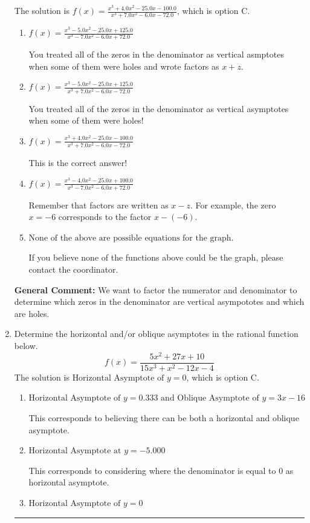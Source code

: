 \documentclass{extbook}[14pt]
\newcommand{\litem}[1]{\item #1

\rule{\textwidth}{0.4pt}}
\begin{document}
\begin{enumerate}
{The solution is \( f(x)=\frac{x^{3} +4.0 x^{2} -25.0 x -100.0}{x^{3} +7.0 x^{2} -6.0 x -72.0} \), which is option C.\begin{enumerate}[label=\Alph*.]
\item \( f(x)=\frac{x^{3} -5.0 x^{2} -25.0 x + 125.0}{x^{3} -7.0 x^{2} -6.0 x + 72.0} \)

You treated all of the zeros in the denominator as vertical asmptotes when some of them were holes and wrote factors as $x+z$.
\item \( f(x)=\frac{x^{3} -5.0 x^{2} -25.0 x + 125.0}{x^{3} +7.0 x^{2} -6.0 x -72.0} \)

You treated all of the zeros in the denominator as vertical asymptotes when some of them were holes!
\item \( f(x)=\frac{x^{3} +4.0 x^{2} -25.0 x -100.0}{x^{3} +7.0 x^{2} -6.0 x -72.0} \)

This is the correct answer!
\item \( f(x)=\frac{x^{3} -4.0 x^{2} -25.0 x + 100.0}{x^{3} -7.0 x^{2} -6.0 x + 72.0} \)

Remember that factors are written as $x-z$. For example, the zero $x=-6$ corresponds to the factor $x-(-6)$.
\item \( \text{None of the above are possible equations for the graph.} \)

If you believe none of the functions above could be the graph, please contact the coordinator.
\end{enumerate}

\textbf{General Comment:} We want to factor the numerator and denominator to determine which zeros in the denominator are vertical asympototes and which are holes.
}
\litem{
Determine the horizontal and/or oblique asymptotes in the rational function below.
\[ f(x) = \frac{5x^{2} +27 x + 10}{15x^{3} + x^{2} -12 x -4} \]The solution is \( \text{Horizontal Asymptote of } y = 0 \), which is option C.\begin{enumerate}[label=\Alph*.]
\item \( \text{Horizontal Asymptote of } y = 0.333 \text{ and Oblique Asymptote of } y = 3x -16 \)

This corresponds to believing there can be both a horizontal and oblique asymptote.
\item \( \text{Horizontal Asymptote at } y = -5.000 \)

This corresponds to considering where the denominator is equal to 0 as horizontal asymptote.
\item \( \text{Horizontal Asymptote of } y = 0 \)


\end{enumerate}}
\end{enumerate}
\end{document}
